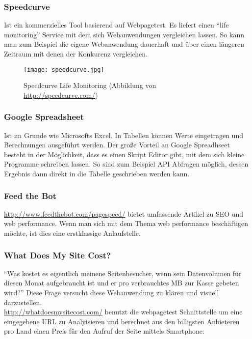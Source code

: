 		

		\subsubsection{Speedcurve} %
		\label{ssub:speedcurve}
			Ist ein kommerzielles Tool basierend auf Webpagetest. Es liefert einen "`life monitoring"' Service mit dem sich Webanwendungen vergleichen lassen. So kann man zum Beispiel die eigene Webanwendung dauerhaft und über einen längeren Zeitraum mit denen der Konkurenz vergleichen. 

			\begin{figure}[htbp]
				\begin{center}
					\texttt{[image: speedcurve.jpg]}
					\caption{Speedcurve Life Monitoring (Abbildung von \url{http://speedcurve.com/})}
					\label{fig:speedcurve}
				\end{center}
			\end{figure}


		\subsubsection{Google Spreadsheet} %
		\label{ssub:google_spreadsheet}
			Ist im Grunde wie Microsofts Excel. In Tabellen können Werte eingetragen und Berechnungen ausgeführt werden.
			Der große Vorteil an Google Spreadhseet besteht in der Möglichkeit, dass es einen Skript Editor gibt, mit dem sich kleine Programme schreiben lassen. So sind zum Beispiel API Abfragen möglich, dessen Ergebnis dann direkt in die Tabelle geschrieben werden kann.		

		\subsubsection{Feed the Bot} %
		\label{ssub:feed_the_bot}
			\url{http://www.feedthebot.com/pagespeed/} bietet umfassende Artikel zu SEO und web performance. Wenn man sich mit dem Thema web performance beschäftigen möchte, ist dies eine erstklassige Anlaufstelle.


		\subsubsection{What Does My Site Cost?} %
		\label{ssub:what_does_my_site_cost}
			"`Was kostet es eigentlich meinene Seitenbesucher, wenn sein Datenvolumen für diesen Monat aufgebraucht ist und er pro verbrauchtes MB zur Kasse gebeten wird?"' Diese Frage versucht diese Webanwendung zu klären und visuell darzustellen.\\
			\url{http://whatdoesmysitecost.com/} benutzt die webpagetest Schnittstelle um eine eingegebene URL zu Analyisieren und berechnet aus den billigsten Anbieteren pro Land einen Preis für den Aufruf der Seite mittels Smartphone:

